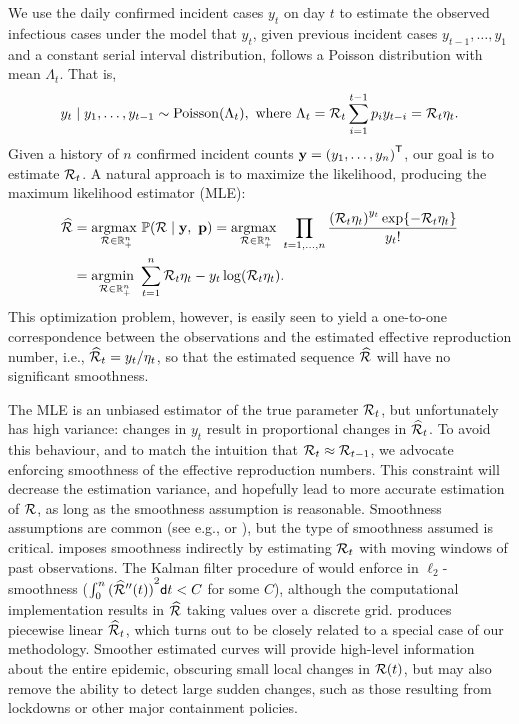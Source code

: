 We use the daily confirmed incident cases $y_t$ on day $t$ to estimate the
observed infectious cases under the model that $y_t$, given previous incident
cases $y_{t-1},\ldots,y_1$ and a constant serial interval distribution, follows a
Poisson distribution with mean $\Lambda_t$. That is, 
$$y_t \mid y_1,\ldots,y_{t-1} \sim \mathrm{Poisson}(\Lambda_t), \textrm{ where } 
\Lambda_t =  \mathcal{R}_t\sum_{i=1}^{t-1}p_i y_{t-i} = \mathcal{R}_t\eta_t.$$ 
Given a history of $n$ confirmed incident counts $\mathbf{y} = {(y_1,\ldots,y_n)}^{\mathsf{T}}$,
our goal is to estimate $\mathcal{R}_t$. A natural approach is to maximize the
likelihood, producing the maximum likelihood estimator (MLE):
\begin{equation} \label{eq:mle}
  \begin{split}
    \widehat{\mathcal{R}} &= \underset{\mathcal{R} \in \mathbb{R}_+^n}{\operatorname*{argmax}\ } \mathbb{P}(\mathcal{R} \mid \mathbf{y},\ \mathbf{p})
    = \underset{\mathcal{R} \in \mathbb{R}^n_+}{\operatorname*{argmax}\ } \prod_{t = 1,\dots,n} 
    \frac{\left(\mathcal{R}_t \eta_t\right)^{y_t} \exp\{- \mathcal{R}_t \eta_t\}  }{y_t!}\\
    &= \underset{\mathcal{R}\in\mathbb{R}^n_+}{\operatorname*{argmin}\ } \sum_{t = 1}^n \mathcal{R}_t\eta_t - 
    y_t\log(\mathcal{R}_t\eta_t).
  \end{split}
\end{equation}
This optimization problem, however, is easily seen to yield a one-to-one
correspondence between the observations and the estimated effective reproduction
number, i.e.,
$\widehat{\mathcal{R}}_t = y_t / \eta_t$, so that the estimated sequence
$\widehat{\mathcal{R}}$ will have no significant smoothness.


The MLE is an unbiased estimator of the true parameter $\mathcal{R}_t$, but
unfortunately has high variance: changes in $y_t$ result in proportional changes
in $\widehat{\mathcal{R}}_t$. To avoid this behaviour, and to match the intuition that
$\mathcal{R}_t \approx \mathcal{R}_{t-1}$, we advocate enforcing smoothness of the effective
reproduction numbers. This constraint will decrease the estimation variance, and
hopefully lead to more accurate estimation of $\mathcal{R}$, as long as the smoothness
assumption is reasonable. Smoothness assumptions are common (see e.g.,
\cite{parag2021improved} or \cite{gostic2020practical}), but the type of
smoothness assumed is critical. \cite{cori2020package} imposes smoothness
indirectly by estimating $\mathcal{R}_t$ with moving windows of past observations. The
Kalman filter procedure of \cite{parag2021improved} would enforce in
$\ell_2$-smoothness ($\int_0^n {(\widehat{\mathcal{R}}''(t))}^{2}\mathsf{d} t < C$ for some
$C$), although the computational implementation results in $\widehat{\mathcal{R}}$
taking values over a discrete grid. \cite{pascal2022nonsmooth} produces
piecewise linear $\widehat{\mathcal{R}}_t$, which turns out to be closely related to a
special case of our methodology. Smoother estimated curves will provide
high-level information about the entire epidemic, obscuring small local changes
in $\mathcal{R}(t)$, but may also remove the ability to detect large sudden changes,
such as those resulting from lockdowns or other major containment policies. 

